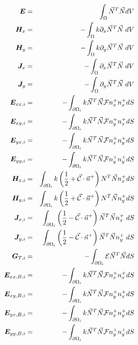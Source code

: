 \begin{footnotesize}
\begin{eqnarray}
{\bm E} &=& \int_\Omega \vec{N}^T \vec{N} dV \\
{\bm H}_x &=&   -\int_\Omega k \partial_x \vec{N}^T \vec{N} \; dV     \\ 
{\bm H}_y &=&   -\int_\Omega k \partial_y \vec{N}^T \vec{N} \; dV     \\ 
{\bm J}_x &=&   -\int_\Omega  \partial_x \vec{N}^T \vec{N} \; dV     \\ 
{\bm J}_y &=&   -\int_\Omega  \partial_y \vec{N}^T \vec{N} \; dV     \\ 
{\bm E}_{xx,i} &=&   -\int_{\partial\Omega_i} k \vec{N}^T\vec{N}  {\cal F} {n}^+_x   n^+_x dS  \\
{\bm E}_{xy,i} &=&   -\int_{\partial\Omega_i} k \vec{N}^T\vec{N}  {\cal F} {n}^+_y   n^+_x dS  \\
{\bm E}_{yx,i} &=&    -\int_{\partial\Omega_i} k \vec{N}^T\vec{N}  {\cal F} {n}^+_x   n^+_y dS  \\
{\bm E}_{yy,i} &=&    -\int_{\partial\Omega_i} k \vec{N}^T\vec{N}  {\cal F} {n}^+_y   n^+_y dS  \\
{\bm H}_{x,i} &=&       \int_{\partial\Omega_i} k \left( \frac{1}{2} + \vec{\cal C} \cdot \vec{n}^+ \right) {N}^T \vec{N} n^+_x dS \\
{\bm H}_{y,i} &=&      \int_{\partial\Omega_i} k \left( \frac{1}{2} + \vec{\cal C} \cdot \vec{n}^+ \right) {N}^T \vec{N} n^+_y dS \\
{\bm J}_{x,i} &=&    \int_{\partial\Omega_i}  \left(\frac{1}{2} - \vec{\cal{C}} \cdot \vec{n}^+ \right) \vec{N}^T \vec{N} n^+_x  \; dS  \\
{\bm J}_{y,i} &=&    \int_{\partial\Omega_i}  \left(\frac{1}{2} - \vec{\cal{C}} \cdot \vec{n}^+ \right) \vec{N}^T \vec{N} n^+_y  \; dS  \\
{\bm G}_{T,i} &=&   -\int_{\partial\Omega_i}   {\cal{E}}   \vec{N}^T \vec{N} dS  \\
{\bm E}_{xx,B,i} &=&     -\int_{\partial\Omega_i} k \vec{N}^T\vec{N}  {\cal F} {n}^+_x   n^+_x dS \\
{\bm E}_{xy,B,i} &=&     -\int_{\partial\Omega_i} k \vec{N}^T\vec{N}  {\cal F} {n}^+_y   n^+_x dS \\
{\bm E}_{yx,B,i} &=&      -\int_{\partial\Omega_i} k \vec{N}^T\vec{N}  {\cal F} {n}^+_x   n^+_y dS \\
{\bm E}_{yy,B,i} &=&      -\int_{\partial\Omega_i} k \vec{N}^T\vec{N}  {\cal F} {n}^+_y   n^+_y dS \\

\end{eqnarray}
\end{footnotesize}
